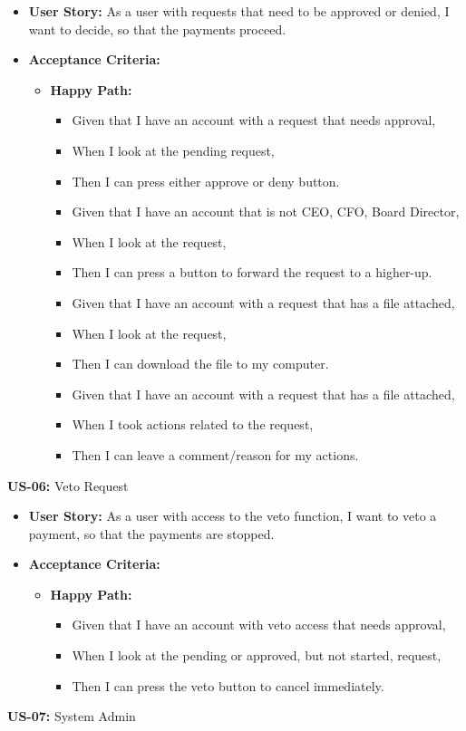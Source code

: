 \documentclass[11pt,a4paper]{article}
\begin{document}
\begin{itemize}
\item
  \textbf{User Story:} As a user with requests that need to be approved
  or denied, I want to decide, so that the payments proceed.
\item
  \textbf{Acceptance Criteria:}

  \begin{itemize}
  \item
    \textbf{Happy Path:}

    \begin{itemize}
    \item
      Given that I have an account with a request that needs approval,
    \item
      When I look at the pending request,
    \item
      Then I can press either approve or deny button.
    \item
      Given that I have an account that is not CEO, CFO, Board Director,
    \item
      When I look at the request,
    \item
      Then I can press a button to forward the request to a higher-up.
    \item
      Given that I have an account with a request that has a file
      attached,
    \item
      When I look at the request,
    \item
      Then I can download the file to my computer.
    \item
      Given that I have an account with a request that has a file
      attached,
    \item
      When I took actions related to the request,
    \item
      Then I can leave a comment/reason for my actions.
    \end{itemize}
  \end{itemize}
\end{itemize}
\textbf{US-06:} Veto Request

\begin{itemize}
\item
  \textbf{User Story:} As a user with access to the veto function, I
  want to veto a payment, so that the payments are stopped.
\item
  \textbf{Acceptance Criteria:}

  \begin{itemize}
  \item
    \textbf{Happy Path:}

    \begin{itemize}
    \item
      Given that I have an account with veto access that needs approval,
    \item
      When I look at the pending or approved, but not started, request,
    \item
      Then I can press the veto button to cancel immediately.
    \end{itemize}
  \end{itemize}
\end{itemize}
\textbf{US-07:} System Admin
\end{document}
